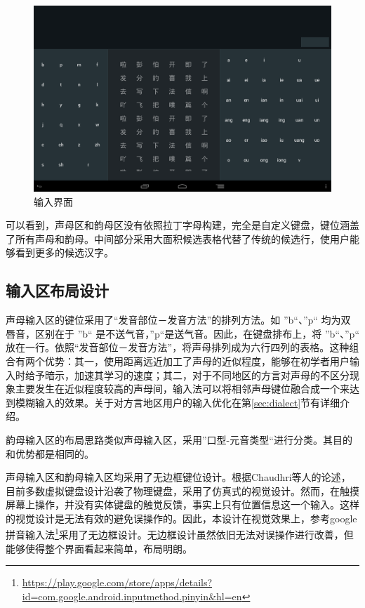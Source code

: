   \begin{figure}[h]
  \noindent\includegraphics[width=150mm]{img/layout1_background}
  \caption{输入界面}
  \label{fig:layout1_background}
  \end{figure}

  可以看到，声母区和韵母区没有依照拉丁字母构建，完全是自定义键盘，键位涵盖了所有声母和韵母。中间部分采用大面积候选表格代替了传统的候选行，使用户能够看到更多的候选汉字。

  \subsection{输入区布局设计}

  声母输入区的键位采用了“发音部位－发音方法”的排列方法。如 ”b“、”p“ 均为双唇音，区别在于 ”b“ 是不送气音，”p“是送气音。因此，在键盘排布上，将 ”b“、”p“ 放在一行。依照“发音部位－发音方法”，将声母排列成为六行四列的表格。这种组合有两个优势：其一，使用距离远近加工了声母的近似程度，能够在初学者用户输入时给予暗示，加速其学习的速度；其二，对于不同地区的方言对声母的不区分现象主要发生在近似程度较高的声母间，输入法可以将相邻声母键位融合成一个来达到模糊输入的效果。关于对方言地区用户的输入优化在第\ref{sec:dialect}节有详细介绍。

  韵母输入区的布局思路类似声母输入区，采用”口型-元音类型“进行分类。其目的和优势都是相同的。

  声母输入区和韵母输入区均采用了无边框键位设计。根据Chaudhri等人的论述\supercite{chaudhri}，目前多数虚拟键盘设计沿袭了物理键盘，采用了仿真式的视觉设计。然而，在触摸屏幕上操作，并没有实体键盘的触觉反馈，事实上只有位置信息这一个输入。这样的视觉设计是无法有效的避免误操作的。因此，本设计在视觉效果上，参考google拼音输入法\footnote{\url{https://play.google.com/store/apps/details?id=com.google.android.inputmethod.pinyin&hl=en}}采用了无边框设计。无边框设计虽然依旧无法对误操作进行改善，但能够使得整个界面看起来简单，布局明朗。

